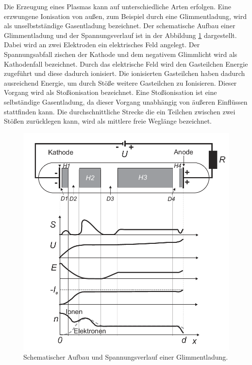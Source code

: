 Die Erzeugung eines Plasmas kann auf unterschiedliche Arten erfolgen. Eine erzwungene Ionisation von außen, zum Beispiel durch eine Glimmentladung, wird als unselbstständige Gasentladung bezeichnet. Der schematische Aufbau einer Glimmentladung und der Spannungsverlauf ist in der Abbildung \ref{fig:Glimmentladung} dargestellt.  Dabei wird an zwei Elektroden ein elektrisches Feld angelegt. Der Spannungsabfall zischen der Kathode und dem negativem Glimmlicht wird als Kathodenfall bezeichnet. Durch das elektrische Feld wird den Gasteilchen Energie zugeführt und diese dadurch ionisiert.  Die ionisierten Gasteilchen haben dadurch ausreichend Energie,  um  durch Stöße weitere Gasteilchen zu  Ionisieren. Dieser Vorgang wird als Stoßionisation bezeichnet. Eine Stoßionisation ist eine selbständige Gasentladung, da dieser Vorgang unabhängig von äußeren Einflüssen stattfinden kann. Die durchschnittliche Strecke die ein Teilchen zwischen zwei Stößen zurücklegen kann, wird als mittlere freie Weglänge bezeichnet. 
\begin{figure}[H]
\centering
\includegraphics[scale=0.4]{Glimmentladung}
\caption{Schematischer Aufbau und Spannungsverlauf einer Glimmentladung.\cite{wiki:Glimmentladung}}
\label{fig:Glimmentladung}
\end{figure}
